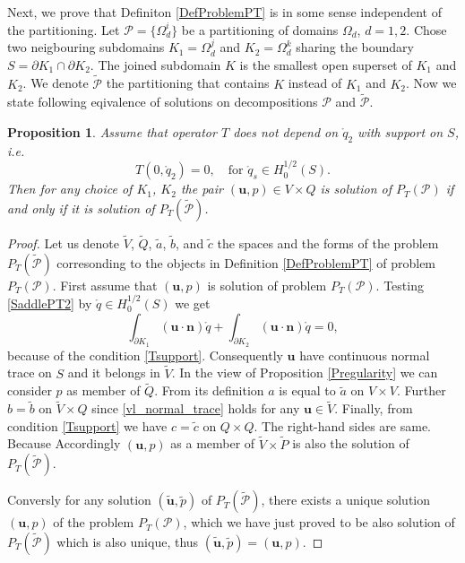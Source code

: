 \documentclass{elsarticle}
\newtheorem{proposition}[thm]{Proposition}
\def\vc#1{\mathbf{\boldsymbol{#1}}}     %
\def\prtl{\partial}                                        %
\def\vl{{\vc{u}}}
\def\mr{\mathring}
\begin{document}
Next, we prove that Definiton \ref{DefProblemPT} is in some sense independent of the partitioning. Let $\mathcal P=\{\Omega_d^i\}$ be a partitioning of domains $\Omega_d$, $d=1,2$. Chose two neigbouring subdomains
$K_1=\Omega_d^j$ and $K_2=\Omega_d^k$ sharing the boundary $S=\prtl K_1\cap \prtl K_2$. The joined subdomain $K$ is the smallest open superset of $K_1$ and $K_2$. We denote $\tilde{ \mathcal P}$ the partitioning that contains
$K$ instead of $K_1$ and $K_2$. Now we state following eqivalence of solutions on decompositions $\mathcal P$ and $\tilde{\mathcal P}$.

\begin{proposition}
\label{PartEqiv}
Assume that operator $T$ does not depend on $\mr{q}_2$ with support on $S$, i.e.
\begin{equation}\label{Tsupport}
   T(0,\mr{q}_2)=0,\quad \text{for } \mr{q}_s\in H^{1/2}_0(S).
\end{equation}
Then for any choice of $K_1$, $K_2$ the pair $(\vl,p)\in V\times Q$ is solution of $P_T(\mathcal P)$ if and only if
it is solution of $P_T(\tilde {\mathcal P})$.
\end{proposition}
\begin{proof}
Let us denote $\tilde V$, $\tilde Q$, $\tilde a$, $\tilde b$, and $\tilde c$ the spaces and the forms of the problem $P_T(\tilde{\mathcal P})$ corresonding to the objects in Definition \ref{DefProblemPT} of problem $P_T(\mathcal P)$. First assume that $(\vl,p)$ is solution of problem $P_T(\mathcal P)$. Testing \eqref{SaddlePT2} by $\mr{q}\in H^{1/2}_0(S)$ we get
\begin{equation}\label{vl_normal_trace}
  \int_{\prtl K_1} (\vl\cdot\vc n) \mr{q}+ \int_{\prtl K_2} (\vl\cdot\vc n) \mr{q} = 0,
\end{equation}
because of the condition \eqref{Tsupport}. Consequently $\vl$ have continuous normal trace on $S$ and it belongs in $\tilde V$. In the view of Proposition \ref{Pregularity} we can consider $p$ as member of $\tilde Q$. From its definition $a$ is equal to $\tilde a$ on $V\times V$. Further $b=\tilde b$ on $\tilde V\times Q$ since \eqref{vl_normal_trace} holds for any $\vl\in \tilde V$. Finally, from condition \eqref{Tsupport} we have $c=\tilde c$ on $Q\times Q$. The right-hand sides are same. Because Accordingly $(\vl, p)$ as a member of $\tilde V\times \tilde P$ is also the solution of $P_T(\tilde{\mathcal P})$.

Conversly for any solution $(\tilde \vl, \tilde p)$ of $P_T(\tilde{\mathcal P})$, there exists a unique solution $(\vl, p)$ of the problem $P_T(\mathcal P)$, which we have just proved to be also solution of $P_T(\tilde{\mathcal P})$
which is also unique, thus $(\tilde \vl, \tilde p)=(\vl, p)$. 
\end{proof}
\end{document}

